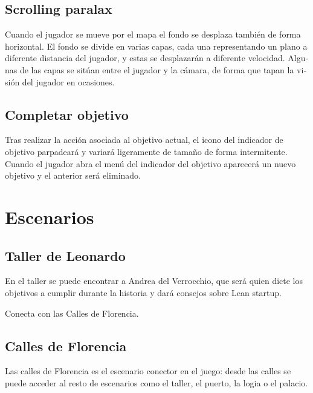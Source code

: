 \subsection[Scrolling paralax]{ Scrolling paralax}
\hypertarget{Toc484614256}{}{
\foreignlanguage{spanish}{Cuando el jugador se mueve por el mapa el fondo se desplaza tambi\'en de forma horizontal. El
fondo se divide en varias capas, cada una representando un plano a diferente distancia del jugador, y estas se
desplazar\'an a diferente velocidad. Algunas de las capas se sit\'uan entre el jugador y la c\'amara, de forma que
tapan la visi\'on del jugador en ocasiones.}}

\subsection[Completar objetivo]{ Completar objetivo}
\hypertarget{Toc484614257}{}{
Tras realizar la acci\'on asociada al objetivo actual, el icono del indicador de objetivo parpadear\'a y variar\'a
ligeramente de tama\~no de forma intermitente. Cuando el jugador abra el men\'u del indicador del objetivo aparecer\'a
un nuevo objetivo y el anterior ser\'a eliminado.}

\section[Escenarios]{ Escenarios}
\hypertarget{Toc484614258}{}\subsection[Taller de Leonardo]{ Taller de Leonardo}
\hypertarget{Toc484614259}{}{
En el taller se puede encontrar a Andrea del Verrocchio, que ser\'a quien dicte los objetivos a cumplir durante la
historia y dar\'a consejos sobre Lean startup.}

{
Conecta con las Calles de Florencia.}

\subsection[Calles de Florencia]{ Calles de Florencia}
\hypertarget{Toc484614260}{}{
Las calles de Florencia es el escenario conector en el juego: desde las calles se puede acceder al resto de escenarios
como el taller, el puerto, la logia o el palacio.}

